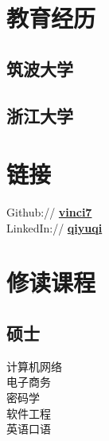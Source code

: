\documentclass[]{deedy-resume-openfont}
\begin{document}
%
%
\lastupdated

%
%

%
%

\begin{minipage}[t]{0.25\textwidth} 


\section{教育经历} 
\sectionsep

\subsection{筑波大学}
\sectionsep

\subsection{浙江大学}
\sectionsep


\section{链接}
\sectionsep
Github:// \href{https://github.com/vinci7}{\bf vinci7} \\
LinkedIn://  \href{https://www.linkedin.com/in/qiyuqi}{\bf qiyuqi} \\


\section{修读课程}
\subsection{硕士}
计算机网络 \\
电子商务 \\
密码学 \\
软件工程 \\
英语口语 \\ 
\sectionsep


\end{minipage}
\end{document}
